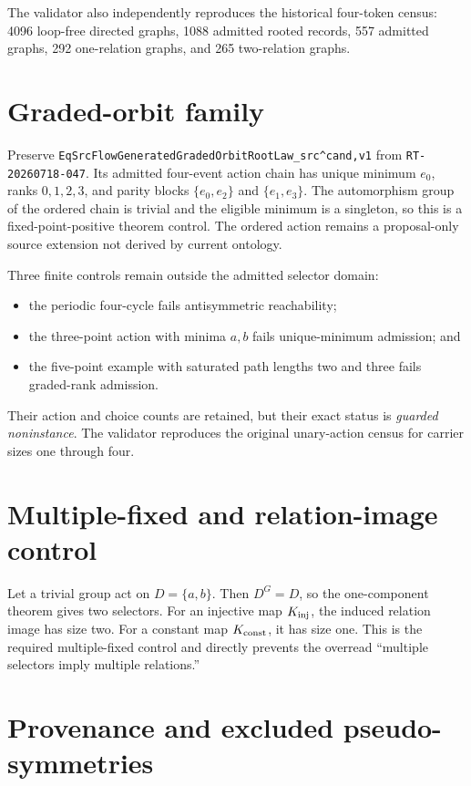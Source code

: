 \documentclass[11pt]{article}
\begin{document}
The validator also independently reproduces the historical four-token census:
4096 loop-free directed graphs, 1088 admitted rooted records, 557 admitted
graphs, 292 one-relation graphs, and 265 two-relation graphs.

\section{Graded-orbit family}

Preserve
\texttt{EqSrcFlowGeneratedGradedOrbitRootLaw\_src\string^cand,v1} from
\texttt{RT-20260718-047}. Its admitted four-event action chain has unique
minimum \(e_0\), ranks \(0,1,2,3\), and parity blocks
\(\{e_0,e_2\}\) and \(\{e_1,e_3\}\). The automorphism group of the ordered
chain is trivial and the eligible minimum is a singleton, so this is a
fixed-point-positive theorem control. The ordered action remains a
proposal-only source extension not derived by current ontology.

Three finite controls remain outside the admitted selector domain:
\begin{itemize}
  \item the periodic four-cycle fails antisymmetric reachability;
  \item the three-point action with minima \(a,b\) fails unique-minimum
        admission; and
  \item the five-point example with saturated path lengths two and three fails
        graded-rank admission.
\end{itemize}
Their action and choice counts are retained, but their exact status is
\emph{guarded noninstance}. The validator reproduces the original unary-action
census for carrier sizes one through four.

\section{Multiple-fixed and relation-image control}

Let a trivial group act on \(D=\{a,b\}\). Then
\(D^G=D\), so the one-component theorem gives two selectors. For an injective
map \(K_{\rm inj}\), the induced relation image has size two. For a constant
map \(K_{\rm const}\), it has size one. This is the required multiple-fixed
control and directly prevents the overread ``multiple selectors imply multiple
relations.''

\section{Provenance and excluded pseudo-symmetries}
\end{document}
